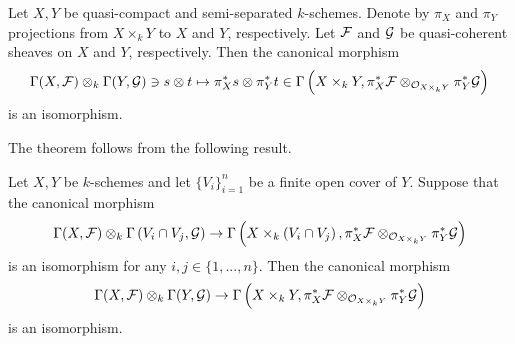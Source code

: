 \begin{theorem}\label{theorem:sections_of_qc_sheaves_on_products}
Let $X,Y$ be quasi-compact and semi-separated $k$-schemes. Denote by $\pi_X$ and $\pi_Y$ projections from $X\times_kY$ to $X$ and $Y$, respectively. Let ${\mathcal F}$ and ${\mathcal G}$ be quasi-coherent sheaves on $X$ and $Y$, respectively. Then the canonical morphism
$$\Gamma(X,{\mathcal F})\otimes_k\Gamma(Y,{\mathcal G})\ni s\otimes t \mapsto \pi_X^*s \otimes \pi_Y^{*}t \in \Gamma\left(X\times_kY,\pi_X^*{\mathcal F}\otimes_{{\mathcal O}_{X\times_kY}}\pi^*_Y{\mathcal G}\right)$$
is an isomorphism.
\end{theorem}
\noindent
The theorem follows from the following result.

\begin{lemma}\label{lemma:sections_and_open_covers_of_a_factor}
Let $X,Y$ be $k$-schemes and let $\{V_i\}_{i=1}^n$ be a finite open cover of $Y$. Suppose that the canonical morphism
$$\Gamma(X,{\mathcal F})\otimes_k\Gamma\left(V_i\cap V_j,{\mathcal G} \right) \rightarrow \Gamma\left( X \times_k \left(V_i\cap V_j\right),\pi_X^*{\mathcal F}\otimes_{{\mathcal O}_{X\times_kY}}\pi^*_Y{\mathcal G}\right)$$
is an isomorphism for any $i,j\in \{1,...,n\}$. Then the canonical morphism
$$\Gamma(X,{\mathcal F})\otimes_k\Gamma(Y,{\mathcal G})\rightarrow \Gamma\left(X\times_kY,\pi_X^*{\mathcal F}\otimes_{{\mathcal O}_{X\times_kY}}\pi^*_Y{\mathcal G}\right)$$
is an isomorphism.
\end{lemma}
